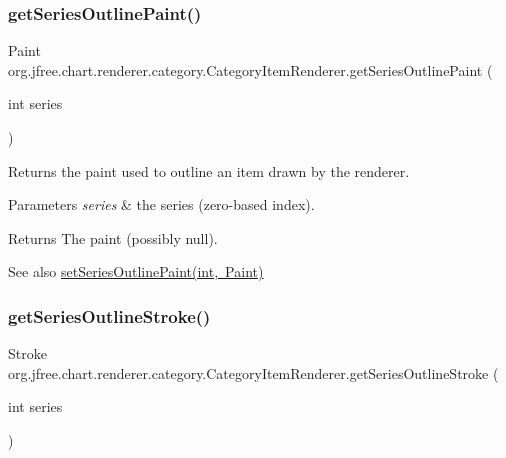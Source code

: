 \subsubsection{\texorpdfstring{get\+Series\+Outline\+Paint()}{getSeriesOutlinePaint()}}
{\footnotesize\ttfamily Paint org.\+jfree.\+chart.\+renderer.\+category.\+Category\+Item\+Renderer.\+get\+Series\+Outline\+Paint (\begin{DoxyParamCaption}\item[{int}]{series }\end{DoxyParamCaption})}

Returns the paint used to outline an item drawn by the renderer.


\begin{DoxyParams}{Parameters}
{\em series} & the series (zero-\/based index).\\
\hline
\end{DoxyParams}
\begin{DoxyReturn}{Returns}
The paint (possibly {\ttfamily null}).
\end{DoxyReturn}
\begin{DoxySeeAlso}{See also}
\mbox{\hyperlink{interfaceorg_1_1jfree_1_1chart_1_1renderer_1_1category_1_1_category_item_renderer_ad9d8d1de6d5a111e38ac539f8eb3e917}{set\+Series\+Outline\+Paint(int, Paint)}} 
\end{DoxySeeAlso}
\mbox{\label{interfaceorg_1_1jfree_1_1chart_1_1renderer_1_1category_1_1_category_item_renderer_af92cab3b28cb791e01ecfab7d562f3cb}} 
\subsubsection{\texorpdfstring{get\+Series\+Outline\+Stroke()}{getSeriesOutlineStroke()}}
{\footnotesize\ttfamily Stroke org.\+jfree.\+chart.\+renderer.\+category.\+Category\+Item\+Renderer.\+get\+Series\+Outline\+Stroke (\begin{DoxyParamCaption}\item[{int}]{series }\end{DoxyParamCaption})}


